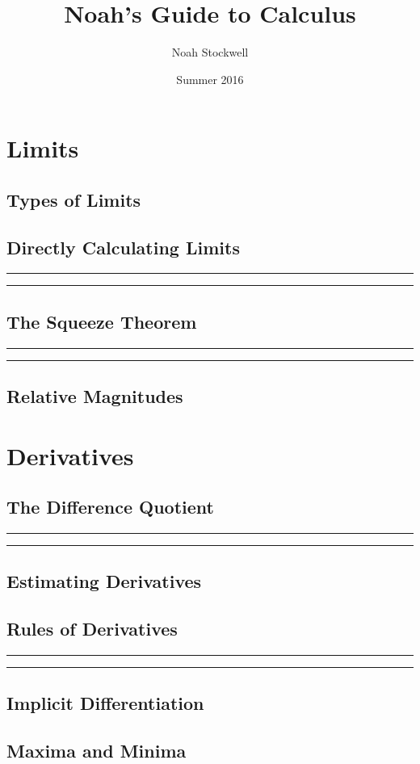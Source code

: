 \documentclass{article}
\title{Noah's Guide to Calculus}
\author{Noah Stockwell}
\date{Summer 2016}
\newcommand{\newchapter}[2]
{
	\subsection{#1}\noindent\rule[0.5ex]{\linewidth}{1pt}\newpage\noindent\rule[0.5ex]{\linewidth}{1pt}\newpage\newpage
}
\begin{document}
\maketitle
\vspace{2in}
\begin{center}\end{center}
\newpage

\newpage
\tableofcontents
\newpage
\section{Limits} 
\subsection{Types of Limits}  
\newchapter{Directly Calculating Limits}{DirectlyCalculatingLimits}
\newchapter{The Squeeze Theorem}{SqueezeTheorem}
\subsection{Relative Magnitudes} \newpage
\section{Derivatives} 
\newchapter{The Difference Quotient}{DifferenceQuotient}
\subsection{Estimating Derivatives}
\newchapter{Rules of Derivatives}{DerivativeRules}
\subsection{Implicit Differentiation}\newpage
\subsection{Maxima and Minima} 
\end{document}
